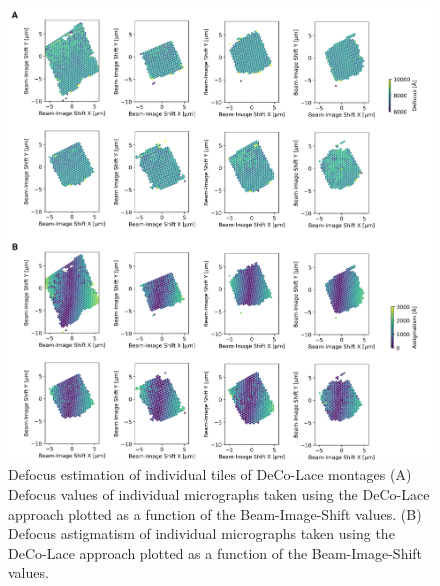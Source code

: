 \documentclass[
]{article}
\newenvironment{fignos:tagged-figure}[1][]{
    \let\oldthefigure\thefigure
    \let\oldtheHfigure\theHfigure
    \renewcommand{\thefigure}{#1}
    \renewcommand{\theHfigure}{#1}
  }{
    \let\thefigure\oldthefigure
    \let\theHfigure\oldtheHfigure
    \addtocounter{figure}{-1}
  }
\begin{document}
\begin{fignos:tagged-figure}[S3]

\begin{figure}
\hypertarget{fig:lamella_spatial_info}{%
\centering
\includegraphics{figures/lamella_spatial_info.png}
\caption{Defocus estimation of individual tiles of DeCo-Lace montages
(A) Defocus values of individual micrographs taken using the DeCo-Lace approach
plotted as a function of the Beam-Image-Shift values.
(B) Defocus astigmatism of individual micrographs taken using the DeCo-Lace approach
plotted as a function of the Beam-Image-Shift values.}\label{fig:lamella_spatial_info}
}
\end{figure}

\end{fignos:tagged-figure}
\end{document}
